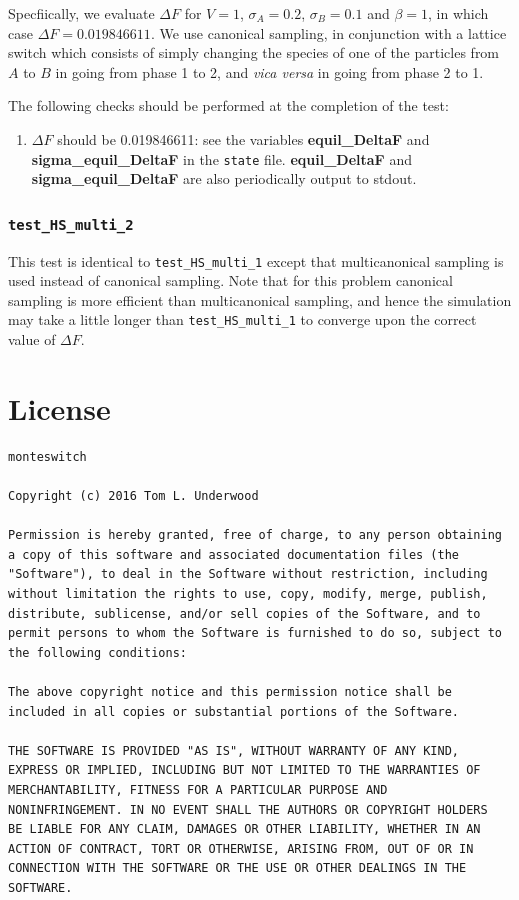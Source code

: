 \documentclass{report}
\begin{document}
Specfiically, we evaluate $\Delta F$ for $V=1$, $\sigma_A=0.2$, $\sigma_B=0.1$ and $\beta=1$, in which case $\Delta F=0.019846611$. We use 
canonical sampling, in conjunction with a lattice switch which consists of simply changing the species of one of the particles from $A$ to $B$ 
in going from phase 1 to 2, and \emph{vica versa} in going from phase 2 to 1.

The following checks should be performed at the completion of the test:
\begin{enumerate}
\item $\Delta F$ should be 0.019846611: see the variables \textbf{equil\_DeltaF} and \textbf{sigma\_equil\_DeltaF} in the \texttt{state} file.
\textbf{equil\_DeltaF} and  \textbf{sigma\_equil\_DeltaF} are also periodically output to stdout.
\end{enumerate}


\subsection{\texttt{test\_HS\_multi\_2}}
This test is identical to \texttt{test\_HS\_multi\_1} except that multicanonical sampling is used instead of canonical sampling. 
Note that for this problem canonical sampling is more efficient than multicanonical sampling, and hence the simulation may take a little 
longer than \texttt{test\_HS\_multi\_1} to converge upon the correct value of $\Delta F$.


\appendix


\chapter{License}
\begin{verbatim}
monteswitch

Copyright (c) 2016 Tom L. Underwood

Permission is hereby granted, free of charge, to any person obtaining 
a copy of this software and associated documentation files (the 
"Software"), to deal in the Software without restriction, including 
without limitation the rights to use, copy, modify, merge, publish, 
distribute, sublicense, and/or sell copies of the Software, and to 
permit persons to whom the Software is furnished to do so, subject to
the following conditions:

The above copyright notice and this permission notice shall be 
included in all copies or substantial portions of the Software.

THE SOFTWARE IS PROVIDED "AS IS", WITHOUT WARRANTY OF ANY KIND, 
EXPRESS OR IMPLIED, INCLUDING BUT NOT LIMITED TO THE WARRANTIES OF 
MERCHANTABILITY, FITNESS FOR A PARTICULAR PURPOSE AND 
NONINFRINGEMENT. IN NO EVENT SHALL THE AUTHORS OR COPYRIGHT HOLDERS 
BE LIABLE FOR ANY CLAIM, DAMAGES OR OTHER LIABILITY, WHETHER IN AN 
ACTION OF CONTRACT, TORT OR OTHERWISE, ARISING FROM, OUT OF OR IN 
CONNECTION WITH THE SOFTWARE OR THE USE OR OTHER DEALINGS IN THE 
SOFTWARE.
\end{verbatim}





\end{document}
